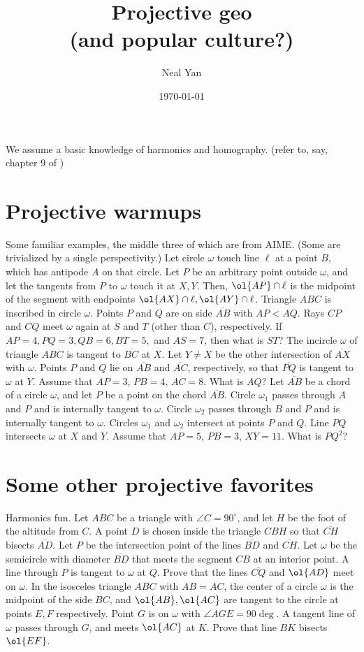 \documentclass[labelsBySect]{seto}
\title{Projective geo\\[0.2em]\smaller{}(and popular culture?)}
\author{Neal Yan}\date\today
\begin{document}
\maketitle
{}
We assume a basic knowledge of harmonics and homography. (refer to, say, chapter 9 of )
\toc
\section{Projective warmups}
Some familiar examples, the middle three of which are from AIME. (Some are trivialized by a single perspectivity.)
 Let circle $\omega$ touch line $\ell$ at a point $B$, which has antipode $A$ on that circle. Let $P$ be an arbitrary point outside $\omega$, and let the tangents from $P$ to $\omega$ touch it at $X,Y$. Then, $\ol{AP}\cap\ell$ is the midpoint of the segment with endpoints $\ol{AX}\cap\ell,\ol{AY}\cap\ell$.	
\exercise[2016 II/10] Triangle $ABC$ is inscribed in circle $\omega$. Points $P$ and $Q$ are on side $\overline{AB}$ with $AP<AQ$. Rays $CP$ and $CQ$ meet $\omega$ again at $S$ and $T$ (other than $C$), respectively. If $AP=4,PQ=3,QB=6,BT=5,$ and $AS=7$, then what is $ST$?
\exercise[2018 II/14]The incircle $\omega$ of triangle $ABC$ is tangent to $\overline{BC}$ at $X$. Let $Y \neq X$ be the other intersection of $\overline{AX}$ with $\omega$. Points $P$ and $Q$ lie on $\overline{AB}$ and $\overline{AC}$, respectively, so that $\overline{PQ}$ is tangent to $\omega$ at $Y$. Assume that $AP = 3$, $PB = 4$, $AC = 8$. What is $AQ$?
\exercise[2019 I/15]Let $\overline{AB}$ be a chord of a circle $\omega$, and let $P$ be a point on the chord $\overline{AB}$. Circle $\omega_1$ passes through $A$ and $P$ and is internally tangent to $\omega$. Circle $\omega_2$ passes through $B$ and $P$ and is internally tangent to $\omega$. Circles $\omega_1$ and $\omega_2$ intersect at points $P$ and $Q$. Line $PQ$ intersects $\omega$ at $X$ and $Y$. Assume that $AP=5$, $PB=3$, $XY=11$. What is $PQ^2$?
\section{Some other projective favorites}
Harmonics fun.
Let $ABC$ be a triangle with $\angle C = 90^{\circ}$, and let $H$ be the foot of the altitude from $C$. A point $D$ is chosen inside the triangle $CBH$ so that $\overline{CH}$ bisects $\overline{AD}$. Let $P$ be the intersection point of the lines $\overline{BD}$ and $\overline{CH}$. Let $\omega$ be the semicircle with diameter $\overline{BD}$ that meets the segment $CB$ at an interior point. A line through $P$ is tangent to $\omega$ at $Q$. Prove that the lines $\overline{CQ}$ and $\ol{AD}$ meet on $\omega$.
In the isosceles triangle $ABC$ with $AB=AC$, the center of a circle $\omega$ is the midpoint of the side $BC$, and $\ol{AB},\ol{AC}$ are tangent to the circle at points $E,F$ respectively. Point $G$ is on $\omega$ with $\angle AGE = 90\deg$. A tangent line of $\omega$ passes through $G$, and meets $\ol{AC}$ at $K$. Prove that line $BK$ bisects $\ol{EF}$.
\end{document}
